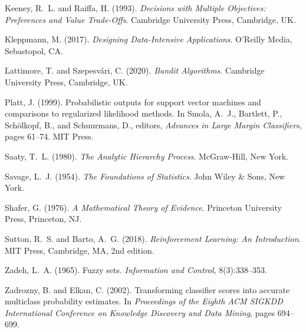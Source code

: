 \documentclass[12pt,a4paper]{article}
\begin{document}
\begin{thebibliography}{99}
Keeney, R.~L. and Raiffa, H. (1993).
\newblock \emph{Decisions with Multiple Objectives: Preferences and Value Trade-Offs}.
\newblock Cambridge University Press, Cambridge, UK.

Kleppmann, M. (2017).
\newblock \emph{Designing Data-Intensive Applications}.
\newblock O'Reilly Media, Sebastopol, CA.

Lattimore, T. and Szepesvári, C. (2020).
\newblock \emph{Bandit Algorithms}.
\newblock Cambridge University Press, Cambridge, UK.

Platt, J. (1999).
\newblock Probabilistic outputs for support vector machines and comparisons to regularized likelihood methods.
\newblock In Smola, A.~J., Bartlett, P., Schölkopf, B., and Schuurmans, D., editors, \emph{Advances in Large Margin Classifiers}, pages 61--74. MIT Press.

Saaty, T.~L. (1980).
\newblock \emph{The Analytic Hierarchy Process}.
\newblock McGraw-Hill, New York.

Savage, L.~J. (1954).
\newblock \emph{The Foundations of Statistics}.
\newblock John Wiley \& Sons, New York.

Shafer, G. (1976).
\newblock \emph{A Mathematical Theory of Evidence}.
\newblock Princeton University Press, Princeton, NJ.

Sutton, R.~S. and Barto, A.~G. (2018).
\newblock \emph{Reinforcement Learning: An Introduction}.
\newblock MIT Press, Cambridge, MA, 2nd edition.

Zadeh, L.~A. (1965).
\newblock Fuzzy sets.
\newblock \emph{Information and Control}, 8(3):338--353.

Zadrozny, B. and Elkan, C. (2002).
\newblock Transforming classifier scores into accurate multiclass probability estimates.
\newblock In \emph{Proceedings of the Eighth ACM SIGKDD International Conference on Knowledge Discovery and Data Mining}, pages 694--699.

\end{thebibliography}
\end{document}
